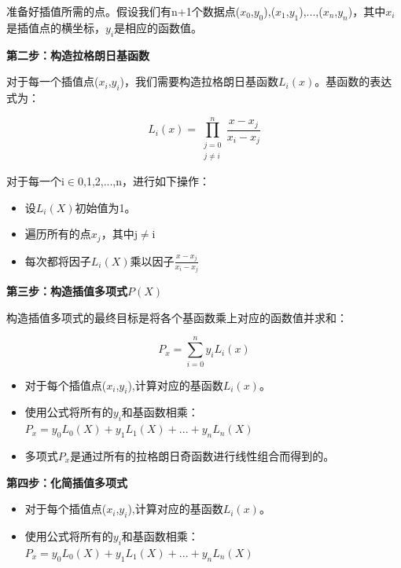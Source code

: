\documentclass[withoutpreface,bwprint]{cumcmthesis}
\begin{document}
准备好插值所需的点。假设我们有n+1个数据点($x_{0}$,$y_{0}$),($x_{1}$,$y_{1}$),...,($x_{n}$,$y_{n}$)，其中$x_{i}$是插值点的横坐标，$y_{i}$是相应的函数值。

\vspace{1em}
\textbf{第二步：构造拉格朗日基函数}

对于每一个插值点($x_{i}$,$y_{i}$)，我们需要构造拉格朗日基函数$L_{i}(x)$。基函数的表达式为：

\[L_i(x) = \prod_{\substack{j=0 \\ j \neq i}}^n \frac{x - x_j}{x_i - x_j}\]

对于每一个i$\in${0,1,2,...,n}，进行如下操作：


\begin{itemize}
    \setlength{\itemindent}{2em}
    \item 设$L_{i}(X)$初始值为1。

    \item 遍历所有的点$x_{j}$，其中j$\neq$i

    \item 每次都将因子$L_{i}(X)$乘以因子$\frac{x - x_j}{x_i - x_j}$
\end{itemize}

\vspace{1em}
\textbf{第三步：构造插值多项式$P(X)$}

构造插值多项式的最终目标是将各个基函数乘上对应的函数值并求和：

\[P_{x}=\sum_{i=0}^{n} y_{i}L_{i}(x)\]

\begin{itemize}
    \setlength{\itemindent}{2em}
    \item 对于每个插值点($x_{i}$,$y_{i}$),计算对应的基函数$L_{i}(x)$。

    \item 使用公式将所有的$y_{i}$和基函数相乘：$P_{x}=y_{0}L_{0}(X)+y_{1}L_{1}(X)+...+y_{n}L_{n}(X)$

    \item 多项式$P_{x}$是通过所有的拉格朗日奇函数进行线性组合而得到的。
\end{itemize}

\vspace{1em}
\textbf{第四步：化简插值多项式}

\begin{itemize}
    \setlength{\itemindent}{2em}
    \item 对于每个插值点($x_{i}$,$y_{i}$),计算对应的基函数$L_{i}(x)$。

    \item 使用公式将所有的$y_{i}$和基函数相乘：$P_{x}=y_{0}L_{0}(X)+y_{1}L_{1}(X)+...+y_{n}L_{n}(X)$

\end{itemize}
\end{document}
